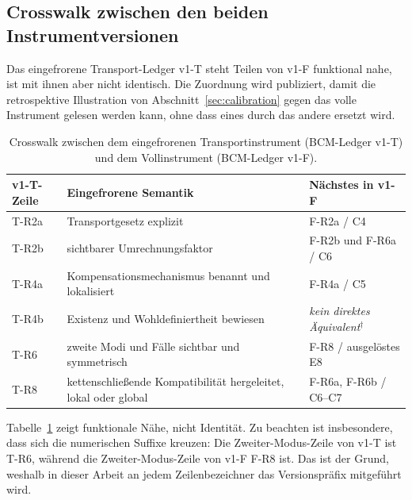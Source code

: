 \documentclass[11pt,a4paper]{article}
\begin{document}
\subsection{Crosswalk zwischen den beiden Instrumentversionen}\label{sec:crosswalk}

Das eingefrorene Transport-Ledger v1-T steht Teilen von v1-F funktional nahe,
ist mit ihnen aber nicht identisch. Die Zuordnung wird publiziert, damit die
retrospektive Illustration von Abschnitt~\ref{sec:calibration} gegen das
volle Instrument gelesen werden kann, ohne dass eines durch das andere
ersetzt wird.

\begin{table}[htbp]
\centering
\caption{Crosswalk zwischen dem eingefrorenen Transportinstrument (BCM-Ledger v1-T) und dem Vollinstrument (BCM-Ledger v1-F).}
\label{tab:crosswalk_v1t_v1f}
\begin{tabularx}{\textwidth}{@{}l >{\raggedright\arraybackslash}X l@{}}
\toprule
v1-T-Zeile & Eingefrorene Semantik & Nächstes in v1-F \\
\midrule
T-R2a & Transportgesetz explizit & F-R2a / C4 \\
T-R2b & sichtbarer Umrechnungsfaktor & F-R2b und F-R6a / C6 \\
T-R4a & Kompensationsmechanismus benannt und lokalisiert & F-R4a / C5 \\
T-R4b & Existenz und Wohldefiniertheit bewiesen & \emph{kein direktes
  Äquivalent}$^{\dagger}$ \\
T-R6 & zweite Modi und Fälle sichtbar und symmetrisch & F-R8 / ausgelöstes
  E8 \\
T-R8 & kettenschließende Kompatibilität hergeleitet, lokal oder global
  & F-R6a, F-R6b / C6--C7 \\
\bottomrule
\end{tabularx}
\end{table}


\noindent
Tabelle~\ref{tab:crosswalk_v1t_v1f} zeigt funktionale Nähe, nicht Identität. Zu beachten ist
insbesondere, dass sich die numerischen Suffixe kreuzen: Die
Zweiter-Modus-Zeile von v1-T ist T-R6, während die Zweiter-Modus-Zeile von
v1-F F-R8 ist. Das ist der Grund, weshalb in dieser Arbeit an jedem
Zeilenbezeichner das Versionspräfix mitgeführt wird.
\end{document}
